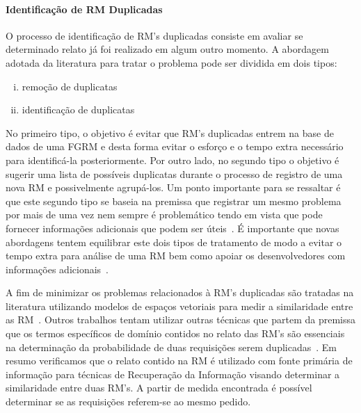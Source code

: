 
\paragraph{Identificação de RM Duplicadas} O processo de identificação de RM's
duplicadas consiste em avaliar se determinado relato já foi realizado em algum
outro momento. A abordagem adotada da literatura para tratar o problema pode ser
dividida em dois tipos\cite{kaushik2012comparative, tian2012improved}:

\begin{enumerate}[(i)]
	\item remoção de duplicatas
	\item identificação de duplicatas
\end{enumerate}

No primeiro tipo, o objetivo é evitar que RM's duplicadas entrem na base de
dados de uma FGRM e desta forma evitar o esforço e o tempo extra necessário para
identificá-la posteriormente. Por outro lado, no segundo tipo o objetivo é
sugerir uma lista de possíveis duplicatas durante o processo de registro de uma
nova RM e possivelmente agrupá-los. Um ponto importante para se ressaltar é que
este segundo tipo se baseia na premissa que registrar um mesmo problema por mais
de uma vez nem sempre é problemático tendo em vista que pode fornecer
informações adicionais que podem ser úteis~\cite{bettenburg2008duplicate}. É
importante que novas abordagens tentem equilibrar este dois tipos de tratamento
de modo a evitar o tempo extra para análise de uma RM bem como apoiar os
desenvolvedores com informações
adicionais~\cite{Lerch:2013:FDY:2495256.2495763,Thung2014}.

A fim de minimizar os problemas relacionados à RM's duplicadas são tratadas na
literatura utilizando modelos de espaços vetoriais para medir a similaridade
entre as RM~\cite{liu2014faceted, sun2010discriminative,
	Thung2014,tomavsev2013exploiting}. Outros
trabalhos tentam utilizar outras técnicas que partem da premissa que os termos
específicos de domínio contidos no relato das RM's são essenciais na
determinação da probabilidade de duas requisições serem
duplicadas~\cite{hindle2016contextual, alipour2013contextual}. Em resumo
verificamos que o relato contido na RM é utilizado com fonte primária de
informação para técnicas de Recuperação da Informação visando determinar a
similaridade entre duas RM's. A partir de medida encontrada é possível
determinar se as requisições referem-se ao mesmo pedido.

